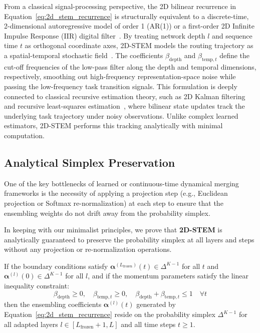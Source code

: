From a classical signal-processing perspective, the 2D bilinear recurrence in Equation~\ref{eq:2d_stem_recurrence} is structurally equivalent to a discrete-time, 2-dimensional autoregressive model of order 1 (AR(1)) or a first-order 2D Infinite Impulse Response (IIR) digital filter~\cite{oppenheim1999discrete}. By treating network depth $l$ and sequence time $t$ as orthogonal coordinate axes, 2D-STEM models the routing trajectory as a spatial-temporal stochastic field~\cite{jain1989fundamentals}. The coefficients $\beta_{\text{depth}}$ and $\beta_{\text{temp}, t}$ define the cut-off frequencies of the low-pass filter along the depth and temporal dimensions, respectively, smoothing out high-frequency representation-space noise while passing the low-frequency task transition signals. This formulation is deeply connected to classical recursive estimation theory, such as 2D Kalman filtering and recursive least-squares estimation~\cite{haykin2002adaptive}, where bilinear state updates track the underlying task trajectory under noisy observations. Unlike complex learned estimators, 2D-STEM performs this tracking analytically with minimal computation.

\subsection{Analytical Simplex Preservation}
One of the key bottlenecks of learned or continuous-time dynamical merging frameworks is the necessity of applying a projection step (e.g., Euclidean projection or Softmax re-normalization) at each step to ensure that the ensembling weights do not drift away from the probability simplex. 

In keeping with our minimalist principles, we prove that \textbf{2D-STEM} is analytically guaranteed to preserve the probability simplex at all layers and steps without any projection or re-normalization operations.

\begin{theorem}
\label{thm:simplex}
If the boundary conditions satisfy $\boldsymbol{\alpha}^{(L_{\text{frozen}})}(t) \in \Delta^{K-1}$ for all $t$ and $\boldsymbol{\alpha}^{(l)}(0) \in \Delta^{K-1}$ for all $l$, and if the momentum parameters satisfy the linear inequality constraint:
\begin{equation}
    \label{eq:simplex_constraint}
    \beta_{\text{depth}} \ge 0, \quad \beta_{\text{temp}, t} \ge 0, \quad \beta_{\text{depth}} + \beta_{\text{temp}, t} \le 1 \quad \forall t
\end{equation}
then the ensembling coefficients $\boldsymbol{\alpha}^{(l)}(t)$ generated by Equation~\ref{eq:2d_stem_recurrence} reside on the probability simplex $\Delta^{K-1}$ for all adapted layers $l \in [L_{\text{frozen}}+1, L]$ and all time steps $t \ge 1$.
\end{theorem}

